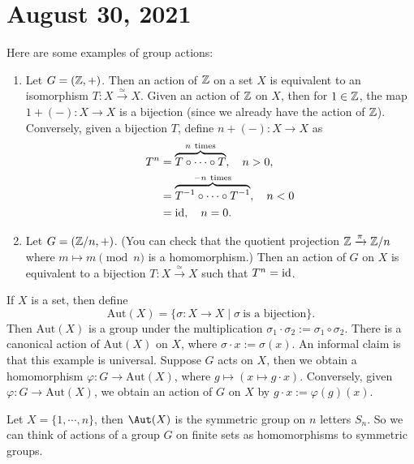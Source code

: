 \section{August 30, 2021}
\begin{example}
    Here are some examples of group actions:
\begin{enumerate}[label=(\arabic*)]
\setlength\itemsep{-.2em}
    \item Let $G=(\mathbb{Z},+)$. Then an action of $\mathbb{Z}$ on a set $X$ is equivalent to an isomorphism $T \colon X \xrightarrow{\simeq } X$. Given an action of $\mathbb{Z}$ on $X$, then for $1 \in \mathbb{Z}$, the map $1+(-) \colon X \to X$ is a bijection (since we already have the action of $\mathbb{Z}$). Conversely, given a bijection $T$, define $n+(-) \colon X \to X$ as 
        \begin{align*}
            T ^n &= \overset{n \ \text{times} }{\overbrace{T \circ \cdots \circ T} } ,\quad n>0,\\
                 &=\overset{-n \ \text{times} }{\overbrace{ T ^{-1} \circ \cdots \circ T^{-1}}},\quad n<0\\
                 &=\operatorname{id},\quad n=0.
\end{align*}
\item Let $G= ( \mathbb{Z}/ n , +) $. (You can check that the quotient projection $\mathbb{Z} \xrightarrow{\pi} \mathbb{Z} /n$ where $m \mapsto m\pmod n$ is a homomorphism.) Then an action of $G$ on $X$ is equivalent to a bijection $T \colon X \xrightarrow{\simeq } X $ such that $T^n =\operatorname{id}$.
\end{enumerate}
\end{example}
\begin{example}
    If $X$ is a set, then define \[
    \mathrm{Aut}(X)= \{\sigma \colon X \to X \mid  \sigma \ \text{is a bijection} \} .
\] Then $\mathrm{Aut}(X)$ is a group under the multiplication $\sigma_1 \cdot  \sigma_2:= \sigma_1 \circ \sigma_2$. There is a canonical action of $\mathrm{Aut}(X)$ on $X$, where $\sigma \cdot  x := \sigma(x)$. An informal claim is that this example is universal. Suppose $G $ acts on $ X$, then we obtain a homomorphism $\varphi  \colon G \to \mathrm{Aut}(X)$, where $g \mapsto (x \mapsto  g \cdot x)$. Conversely, given $\varphi  \colon G \to \mathrm{Aut}(X)$, we obtain an action of $G$ on $X$ by $g \cdot x:= \varphi (g)(x)$.
\end{example}
\begin{remark}
    Let $X= \{1,\cdots ,n\} $, then $\Aut(X)$ is the symmetric group on $n$ letters $S_n $. So we can think of actions of a group $G$ on finite sets as homomorphisms to symmetric groups.
\end{remark}
